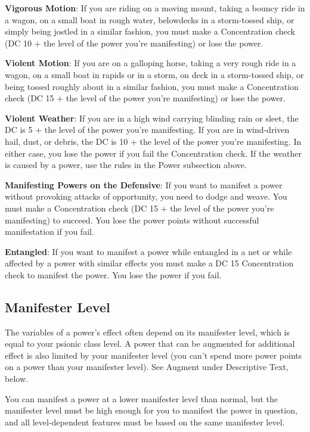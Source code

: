 \textbf{Vigorous Motion}: If you are riding on a moving mount, taking a bouncy ride in a wagon, on a small boat in rough water, belowdecks in a storm-tossed ship, or simply being jostled in a similar fashion, you must make a Concentration check (DC 10 + the level of the power you're manifesting) or lose the power.

\textbf{Violent Motion}: If you are on a galloping horse, taking a very rough ride in a wagon, on a small boat in rapids or in a storm, on deck in a storm-tossed ship, or being tossed roughly about in a similar fashion, you must make a Concentration check (DC 15 + the level of the power you're manifesting) or lose the power.

\textbf{Violent Weather}: If you are in a high wind carrying blinding rain or sleet, the DC is 5 + the level of the power you're manifesting. If you are in wind-driven hail, dust, or debris, the DC is 10 + the level of the power you're manifesting. In either case, you lose the power if you fail the Concentration check. If the weather is caused by a power, use the rules in the Power subsection above.

\textbf{Manifesting Powers on the Defensive}: If you want to manifest a power without provoking attacks of opportunity, you need to dodge and weave. You must make a Concentration check (DC 15 + the level of the power you're manifesting) to succeed. You lose the power points without successful manifestation if you fail.

\textbf{Entangled}: If you want to manifest a power while entangled in a net or while affected by a power with similar effects you must make a DC 15 Concentration check to manifest the power. You lose the power if you fail.

\subsection{Manifester Level}
The variables of a power's effect often depend on its manifester level, which is equal to your psionic class level. A power that can be augmented for additional effect is also limited by your manifester level (you can't spend more power points on a power than your manifester level). See Augment under Descriptive Text, below.

You can manifest a power at a lower manifester level than normal, but the manifester level must be high enough for you to manifest the power in question, and all level-dependent features must be based on the same manifester level.

